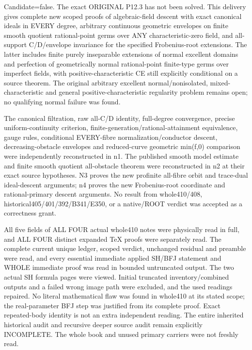 \documentclass[11pt]{article}
\begin{document}
Candidate=false. The exact ORIGINAL P12.3 has not been solved. This delivery gives complete new scoped proofs of algebraic-field descent with exact canonical ideals in EVERY degree, arbitrary continuous geometric envelopes on finite smooth quotient rational-point germs over ANY characteristic-zero field, and all-support C/D/envelope invariance for the specified Frobenius-root extensions. The latter includes finite purely inseparable extensions of normal excellent domains and perfection of geometrically normal rational-point finite-type germs over imperfect fields, with positive-characteristic CE still explicitly conditional on a source theorem. The original arbitrary excellent normal/nonisolated, mixed-characteristic and general positive-characteristic regularity problem remains open; no qualifying normal failure was found.

The canonical filtration, raw all-C/D identity, full-degree convergence, precise uniform-continuity criterion, finite-generation/rational-attainment equivalence, gauge rules, conditional EVERY-fibre normalization/conductor descent, decreasing-obstacle envelopes and reduced-curve geometric min(f,0) comparison were independently reconstructed in n1. The published smooth model estimate and finite smooth quotient all-obstacle theorem were reconstructed in n2 at their exact source hypotheses. N3 proves the new profinite all-fibre orbit and trace-dual ideal-descent arguments; n4 proves the new Frobenius-root coordinate and rational-primary descent arguments. No result from whole410/408, historical405/401/392/B341/E350, or a native/ROOT verdict was accepted as a correctness grant.

All five fields of ALL FOUR actual whole410 notes were physically read in full, and ALL FOUR distinct expanded TeX proofs were separately read. The complete current unique ledger, scoped verdict, unchanged residual and preamble were read, and every essential immediate applied SH/BFJ statement and WHOLE immediate proof was read in bounded untruncated output. The two actual SH formula pages were viewed. Initial truncated inventory/combined outputs and a failed wrong image path were excluded, and the used readings repaired. No literal mathematical flaw was found in whole410 at its stated scope; the real-parameter BFJ step was justified from its complete proof. Exact repeated-body identity is not an extra independent reading. The entire inherited historical audit and recursive deeper source audit remain explicitly INCOMPLETE. The whole book and unused primary carriers were not freshly read.
\end{document}

